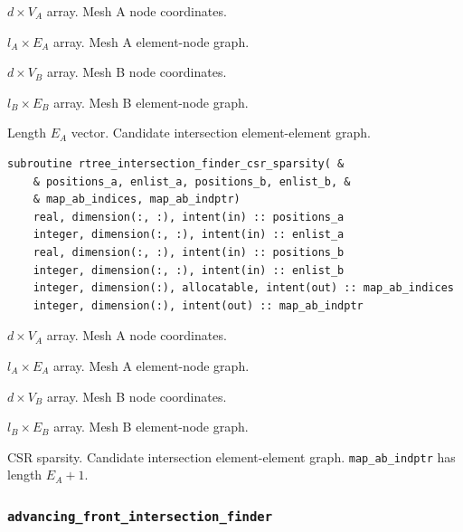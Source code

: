 \documentclass{article}
\begin{document}
\begin{description}[font=\ttfamily\bfseries,leftmargin=2.2\parindent,labelindent=1.7\parindent,noitemsep]
  \item[positions\_a] $d \times V_A$ array. Mesh A node coordinates.
  \item[enlist\_a] $l_A \times E_A$ array. Mesh A element-node graph.
  \item[positions\_b] $d \times V_B$ array. Mesh B node coordinates.
  \item[enlist\_b] $l_B \times E_B$ array. Mesh B element-node graph.
  \item[map\_ab] Length $E_A$ vector. Candidate intersection element-element
    graph.
\end{description}

\begin{lstlisting}[language=FORTRAN]
  subroutine rtree_intersection_finder_csr_sparsity( &
    & positions_a, enlist_a, positions_b, enlist_b, &
    & map_ab_indices, map_ab_indptr)
    real, dimension(:, :), intent(in) :: positions_a
    integer, dimension(:, :), intent(in) :: enlist_a
    real, dimension(:, :), intent(in) :: positions_b
    integer, dimension(:, :), intent(in) :: enlist_b
    integer, dimension(:), allocatable, intent(out) :: map_ab_indices
    integer, dimension(:), intent(out) :: map_ab_indptr
\end{lstlisting}

\begin{description}[font=\ttfamily\bfseries,leftmargin=2.2\parindent,labelindent=1.7\parindent,noitemsep]
  \item[positions\_a] $d \times V_A$ array. Mesh A node coordinates.
  \item[enlist\_a] $l_A \times E_A$ array. Mesh A element-node graph.
  \item[positions\_b] $d \times V_B$ array. Mesh B node coordinates.
  \item[enlist\_b] $l_B \times E_B$ array. Mesh B element-node graph.
  \item[map\_ab\_indices, map\_ab\_indptr] CSR sparsity. Candidate intersection
    element-element graph. \linebreak \verb+map_ab_indptr+ has length $E_A + 1$.
\end{description}

\subsubsection{\texttt{advancing\_front\_intersection\_finder}}
\end{document}
